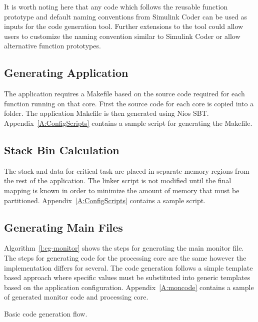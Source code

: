 	It is worth noting here that any code which follows the reusable function prototype and default naming conventions from Simulink Coder can be used as inputs for the code generation tool. Further extensions to the tool could allow users to customize the naming convention similar to Simulink Coder or allow alternative function prototypes.
	
\subsection{Generating Application}

	The application requires a Makefile based on the source code required for each function running on that core. First the source code for each core is copied into a folder. The application Makefile is then generated using Nios SBT. Appendix~\ref{A:ConfigScripts} contains a sample script for generating the Makefile. 

\subsection{Stack Bin Calculation}

	The stack and data for critical task are placed in separate memory regions from the rest of the application. 
	The linker script is not modified until the final mapping is known in order to minimize the amount of memory that must be partitioned.
	Appendix~\ref{A:ConfigScripts} contains a sample script.

\subsection{Generating Main Files}

	Algorithm~\ref{l:cg-monitor} shows the steps for generating the main monitor file. 
	The steps for generating code for the processing core are the same however the implementation differs for several. 
	The code generation follows a simple template based approach where specific values must be substituted into generic templates based on the application configuration.
	Appendix~\ref{A:moncode} contains a sample of generated monitor code and processing core.


\begin{algorithm}

\caption{Basic code generation flow.}
\label{l:cg-monitor}
\end{algorithm}

